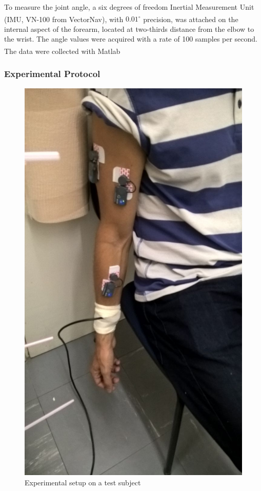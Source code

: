 To measure the joint angle, a six degrees of freedom Inertial Measurement Unit (IMU, VN-100 from VectorNav\textsuperscript{\textregistered}), with \(0.01^{\circ}\) precision, was attached on the internal aspect of the forearm, located at two-thirds distance from the elbow to the wrist. The angle values were acquired with a rate of 100 samples per second. The data were collected with Matlab\textsuperscript{\textregistered} 

\subsubsection{Experimental Protocol}

\begin{figure}[thpb]
      \centering
      \includegraphics[scale=0.32]{Images/Experiment_Image.jpg}
      \caption{Experimental setup on a test subject}
      \label{Experimental Setup}
   \end{figure}

